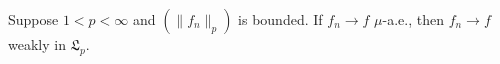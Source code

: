 Suppose $1 < p < \infty$ and $(\|f_n\|_p)$ is bounded. If $f_n \to f$ $\mu$-a.e., then $f_n \to f$ weakly in $\mathfrak{L}_p$.
